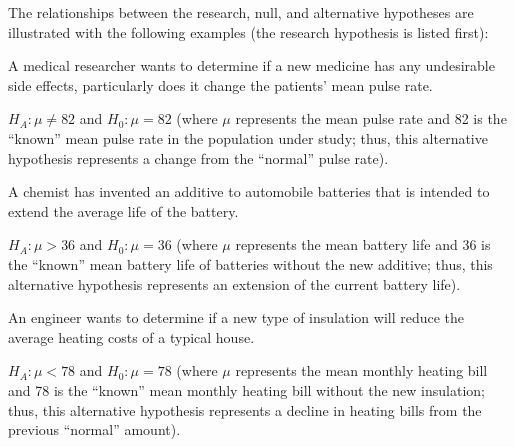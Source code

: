 \documentclass[10pt,openany]{book}\usepackage[]{graphicx}\usepackage[]{color}
\begin{document}

\vspace{-12pt}

\vspace{-12pt}

\vspace{-12pt}

The relationships between the research, null, and alternative hypotheses are illustrated with the following examples (the research hypothesis is listed first):

\begin{Enumerate}
  \item A medical researcher wants to determine if a new medicine has any undesirable side effects, particularly does it change the patients' mean pulse rate.
  \begin{Itemize}
    \item $H_{A}:\mu\neq82$ and $H_{0}:\mu=82$ (where $\mu$ represents the mean pulse rate and 82 is the ``known'' mean pulse rate in the population under study; thus, this alternative hypothesis represents a change from the ``normal'' pulse rate).
  \end{Itemize}
   \item A chemist has invented an additive to automobile batteries that is intended to extend the average life of the battery.
  \begin{Itemize}
    \item $H_{A}:\mu>36$ and $H_{0}:\mu=36$ (where $\mu$ represents the mean battery life and 36 is the ``known'' mean battery life of batteries without the new additive; thus, this alternative hypothesis represents an extension of the current battery life).
  \end{Itemize}
  \item An engineer wants to determine if a new type of insulation will reduce the average heating costs of a typical house.
   \begin{Itemize}
    \item $H_{A}:\mu<78$ and $H_{0}:\mu=78$ (where $\mu$ represents the mean monthly heating bill and 78 is the ``known'' mean monthly heating bill without the new insulation; thus, this alternative hypothesis represents a decline in heating bills from the previous ``normal'' amount).
  \end{Itemize}
\end{Enumerate}
\end{document}
